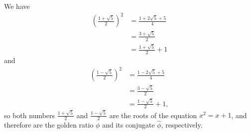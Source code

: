 
\noindent We have
\begin{align*}
    \left(\frac{1+\!\sqrt{5}}{2}\right)^2 &= \frac{1+2\!\sqrt{5}+5}{4} \\
    &= \frac{3+\!\sqrt{5}}{2} \\[1mm]
    &= \frac{1+\!\sqrt{5}}{2}+1
\end{align*}
and
\begin{align*}
    \left(\frac{1-\!\sqrt{5}}{2}\right)^2 &= \frac{1-2\!\sqrt{5}+5}{4} \\
    &= \frac{3-\!\sqrt{5}}{2} \\[1mm]
    &= \frac{1-\!\sqrt{5}}{2}+1,
\end{align*}
so both numbers $\frac{1+\!\sqrt{5}}{2}$ and $\frac{1-\!\sqrt{5}}{2}$ are the roots of the equation $x^2=x+1$, and therefore are the golden ratio $\phi$ and its conjugate $\widehat\phi$, respectively.
